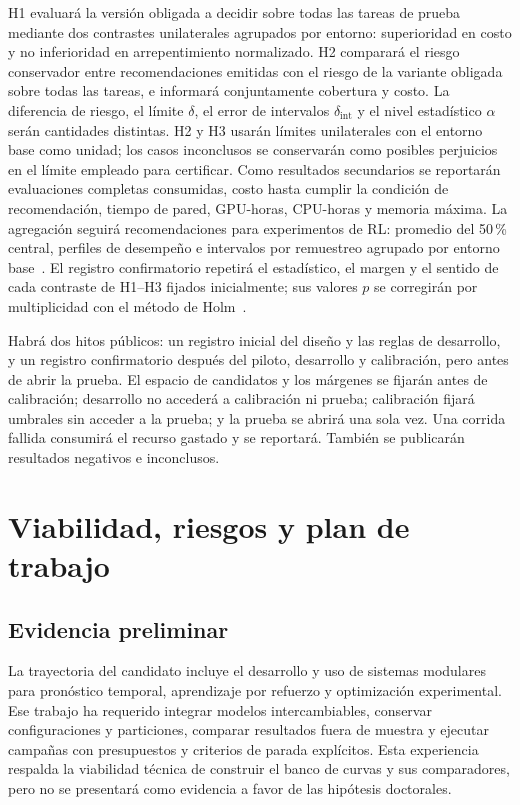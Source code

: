 \documentclass[11pt,letterpaper]{article}
\begin{document}
H1 evaluará la versión obligada a decidir sobre todas las tareas de prueba mediante dos contrastes unilaterales agrupados por entorno: superioridad en costo y no inferioridad en arrepentimiento normalizado.
H2 comparará el riesgo conservador entre recomendaciones emitidas con el riesgo de la variante obligada sobre todas las tareas, e informará conjuntamente cobertura y costo.
La diferencia de riesgo, el límite $\delta$, el error de intervalos $\delta_{\mathrm{int}}$ y el nivel estadístico $\alpha$ serán cantidades distintas.
H2 y H3 usarán límites unilaterales con el entorno base como unidad; los casos inconclusos se conservarán como posibles perjuicios en el límite empleado para certificar.
Como resultados secundarios se reportarán evaluaciones completas consumidas, costo hasta cumplir la condición de recomendación, tiempo de pared, GPU-horas, CPU-horas y memoria máxima.
La agregación seguirá recomendaciones para experimentos de RL: promedio del 50\,\% central, perfiles de desempeño e intervalos por remuestreo agrupado por entorno base~\cite{agarwal2021precipice}.
El registro confirmatorio repetirá el estadístico, el margen y el sentido de cada contraste de H1--H3 fijados inicialmente; sus valores $p$ se corregirán por multiplicidad con el método de Holm~\cite{holm1979multiple}.

Habrá dos hitos públicos: un registro inicial del diseño y las reglas de desarrollo, y un registro confirmatorio después del piloto, desarrollo y calibración, pero antes de abrir la prueba.
El espacio de candidatos y los márgenes se fijarán antes de calibración; desarrollo no accederá a calibración ni prueba; calibración fijará umbrales sin acceder a la prueba; y la prueba se abrirá una sola vez.
Una corrida fallida consumirá el recurso gastado y se reportará.
También se publicarán resultados negativos e inconclusos.

\section{Viabilidad, riesgos y plan de trabajo}

\subsection{Evidencia preliminar}

La trayectoria del candidato incluye el desarrollo y uso de sistemas modulares para pronóstico temporal, aprendizaje por refuerzo y optimización experimental.
Ese trabajo ha requerido integrar modelos intercambiables, conservar configuraciones y particiones, comparar resultados fuera de muestra y ejecutar campañas con presupuestos y criterios de parada explícitos.
Esta experiencia respalda la viabilidad técnica de construir el banco de curvas y sus comparadores, pero no se presentará como evidencia a favor de las hipótesis doctorales.
\end{document}

